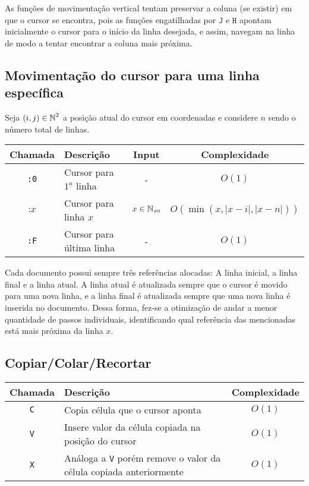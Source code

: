 \documentclass[a4paper, 11pt]{article}
\begin{document}
As funções de movimentação vertical tentam preservar a coluna (se existir) em que o cursor se encontra, pois as funções engatilhadas por $\texttt J$ e $\texttt H$ apontam inicialmente o cursor para o início da linha desejada, e assim, navegam na linha de modo a tentar encontrar a coluna mais próxima.  

\subsection{Movimentação do cursor para uma linha específica}

Seja $(i, j) \in \operatorname{\mathbb{N}}^2$ a posição atual do cursor em coordenadas e considere $n$ sendo o número total de linhas.
\begin{table}[H]
\centering
\begin{tabularx}{\linewidth}{|c|X|c|c|}
\hline
\textbf{Chamada} & \textbf{Descrição} & \textbf{Input} & \textbf{Complexidade} \\ 
\hline
\texttt{:0} & Cursor para $1^{\underline{a}}$ linha & - & $O(1)$ \\
$\texttt{:}x$ & Cursor para linha $x$ & $x\in \sub{\N}{\neq 0}$ & $O(\min(x, |x-i|, |x-n|))$ \\
\texttt{:F} & Cursor para última linha  & - & $O(1)$ \\
\hline
\end{tabularx}
\end{table}

Cada documento possui sempre três referências alocadas: A linha inicial, a linha final e a linha atual. A linha atual é atualizada sempre que o cursor é movido para uma nova linha, e a linha final é atualizada sempre que uma nova linha é inserida no documento. Dessa forma, fez-se a otimização de andar a menor quantidade de passos individuais, identificando qual referência das mencionadas está mais próxima da linha $x$. 

\subsection{Copiar/Colar/Recortar}
\begin{table}[H]
\centering
\begin{tabularx}{\linewidth}{|c|X|c|}
\hline
\textbf{Chamada} & \textbf{Descrição} & \textbf{Complexidade}
\\ 
\hline
\texttt{C} & Copia célula que o cursor aponta & $O(1)$ \\
\texttt{V} & Insere valor da célula copiada na posição do cursor & $O(1)$ \\
\texttt{X} & Análoga a \texttt{V} porém remove o valor da célula copiada anteriormente & $O(1)$ \\
\hline
\end{tabularx}
\end{table}
\end{document}
